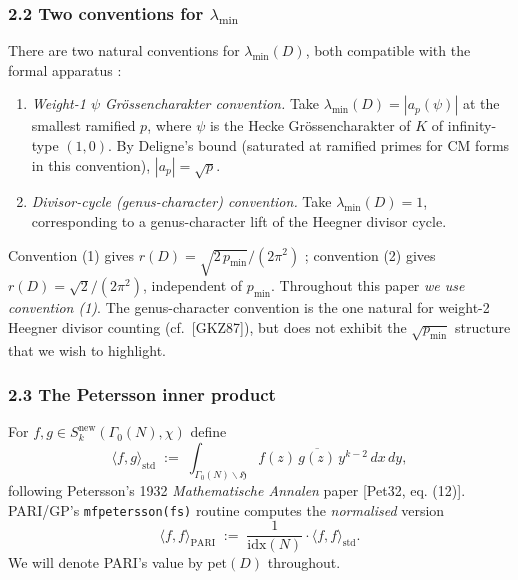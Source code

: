 \documentclass[
  11pt,
  a4paper,
]{amsart}
\providecommand{\tightlist}{\setlength{\itemsep}{0pt}\setlength{\parskip}{0pt}}
\providecommand{\tightlist}{%
  \setlength{\itemsep}{0pt}\setlength{\parskip}{0pt}}
\begin{document}
\hypertarget{two-conventions-for-lambda_min}{%
\subsubsection{\texorpdfstring{2.2 Two conventions for \(\lambda_{\min}\)}{2.2 Two conventions for \textbackslash lambda\_\{\textbackslash min\}}}\label{two-conventions-for-lambda_min}}

There are two natural conventions for \(\lambda_{\min}(D)\), both compatible with the formal apparatus :

\begin{enumerate}
\def\labelenumi{\arabic{enumi}.}
\tightlist
\item
  \emph{Weight-1 \(\psi\) Grössencharakter convention.} Take \(\lambda_{\min}(D) = |a_{p}(\psi)|\) at the smallest ramified \(p\), where \(\psi\) is the Hecke Grössencharakter of \(K\) of infinity-type \((1,0)\). By Deligne's bound (saturated at ramified primes for CM forms in this convention), \(|a_p|=\sqrt{p}\).
\item
  \emph{Divisor-cycle (genus-character) convention.} Take \(\lambda_{\min}(D) = 1\), corresponding to a genus-character lift of the Heegner divisor cycle.
\end{enumerate}

Convention (1) gives \(r(D) = \sqrt{2\,p_{\min}}/(2\pi^{2})\) ; convention (2) gives \(r(D) = \sqrt 2/(2\pi^{2})\), independent of \(p_{\min}\). Throughout this paper \emph{we use convention (1)}. The genus-character convention is the one natural for weight-2 Heegner divisor counting (cf.~{[}GKZ87{]}), but does not exhibit the \(\sqrt{p_{\min}}\) structure that we wish to highlight.

\hypertarget{the-petersson-inner-product}{%
\subsubsection{2.3 The Petersson inner product}\label{the-petersson-inner-product}}

For \(f, g \in S_{k}^{\mathrm{new}}(\Gamma_0(N), \chi)\) define
\[
\langle f, g\rangle_{\mathrm{std}} \;:=\; \int_{\Gamma_0(N)\backslash \mathfrak{H}} f(z)\,\overline{g(z)}\, y^{k-2}\,dx\,dy,
\]
following Petersson's 1932 \emph{Mathematische Annalen} paper {[}Pet32, eq. (12){]}. PARI/GP's \texttt{mfpetersson(fs)} routine computes the \emph{normalised} version
\[
\langle f, f\rangle_{\mathrm{PARI}} \;:=\; \frac{1}{\mathrm{idx}(N)} \cdot \langle f, f\rangle_{\mathrm{std}}.
\]
We will denote PARI's value by \(\mathrm{pet}(D)\) throughout.
\end{document}
